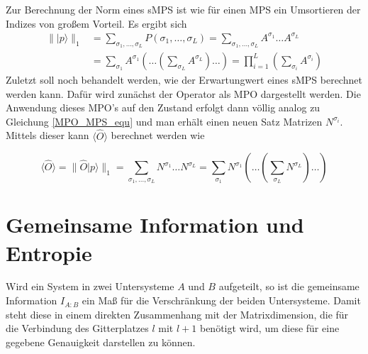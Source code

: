 \documentclass[10pt,a4paper]{report}
\newcommand{\SumIndex}{\sigma_1,\ldots,\sigma_L}
\begin{document}
Zur Berechnung der Norm eines sMPS ist wie für einen MPS ein Umsortieren der Indizes von großem Vorteil. Es ergibt sich
\begin{equation}
\begin{split}
\parallel|p\rangle\parallel_1&=\sum_{\SumIndex}P(\SumIndex)=\sum_{\SumIndex}A^{\sigma_1}\ldots A^{\sigma_L}\\
&=\sum_{\sigma_1}A^{\sigma_1}(\ldots(\sum_{\sigma_L}A^{\sigma_L})\ldots)=\prod_{i=1}^L(\sum_{\sigma_i}A^{\sigma_i})
\end{split}
\end{equation}
Zuletzt soll noch behandelt werden, wie der Erwartungwert eines sMPS berechnet werden kann. Dafür wird zunächst der Operator als MPO dargestellt werden. Die Anwendung dieses MPO's auf den Zustand erfolgt dann völlig analog zu Gleichung \ref{MPO_MPS_equ} und man erhält einen neuen Satz Matrizen $N^{\sigma_i}$. Mittels dieser kann $\langle\hat{O}\rangle$ berechnet werden wie

\begin{equation}
\langle\hat{O}\rangle=\parallel \hat{O}|p\rangle\parallel_1=\sum_{\SumIndex}N^{\sigma_1}\ldots N^{\sigma_L}=\sum_{\sigma_1}N^{\sigma_1}(\ldots(\sum_{\sigma_L}N^{\sigma_L})\ldots)
\end{equation}

\section{Gemeinsame Information und Entropie}\label{information_entropy}
Wird ein System in zwei Untersysteme $A$ und $B$ aufgeteilt, so ist die gemeinsame Information $I_{A:B}$ ein Maß für die Verschränkung der beiden Untersysteme. Damit steht diese in einem direkten Zusammenhang mit der Matrixdimension, die für die Verbindung des Gitterplatzes $l$ mit $l+1$ benötigt wird, um diese für eine gegebene Genauigkeit darstellen zu können.\\
\end{document}
